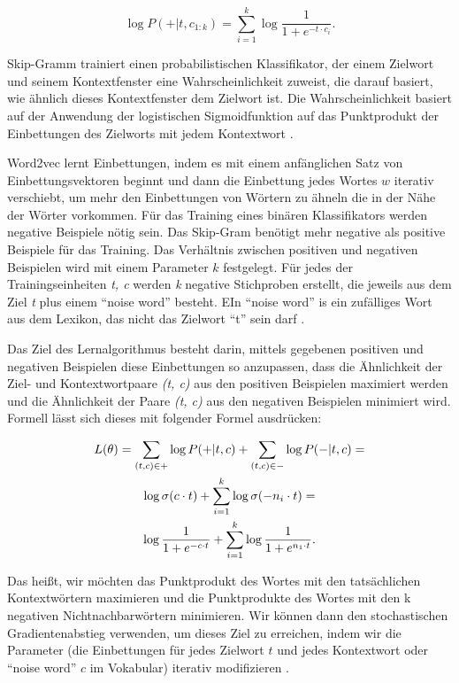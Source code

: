 \begin{equation} \label{Formel3_4}
    \log P(+|t,c_{1:k}) =\sum ^{k}_{i=1} \log \frac{1}{1+e^{-t\cdot c_{i}}}.
\end{equation}


Skip-Gramm trainiert einen probabilistischen Klassifikator, der einem Zielwort und seinem Kontextfenster eine Wahrscheinlichkeit zuweist, die darauf basiert, wie ähnlich dieses Kontextfenster dem Zielwort ist. Die Wahrscheinlichkeit basiert auf der Anwendung der logistischen Sigmoidfunktion auf das Punktprodukt der Einbettungen des Zielworts mit jedem Kontextwort \cite*[113]{Jurafskya}.

Word2vec lernt Einbettungen, indem es mit einem anfänglichen Satz von Einbettungsvektoren beginnt und dann die Einbettung jedes Wortes $w$ iterativ verschiebt, um mehr den Einbettungen von Wörtern zu ähneln die in der Nähe der Wörter vorkommen. Für das Training eines binären Klassifikators werden negative Beispiele nötig sein. Das Skip-Gram benötigt mehr negative als positive Beispiele für das Training. Das Verhältnis zwischen positiven und negativen Beispielen wird mit einem Parameter $k$ festgelegt. Für jedes der Trainingseinheiten \textit{t, c} werden \textit{k} negative Stichproben erstellt, die jeweils aus dem Ziel \textit{t} plus einem \enquote{noise word} besteht. EIn \enquote{noise word} is ein zufälliges Wort aus dem Lexikon, das nicht das Zielwort \enquote{t} sein darf \cite*[113]{Jurafskya}.

Das Ziel des Lernalgorithmus besteht darin, mittels gegebenen positiven und negativen Beispielen diese Einbettungen so anzupassen, dass die Ähnlichkeit der Ziel- und Kontextwortpaare \textit{(t, c)} aus den positiven Beispielen maximiert werden und die Ähnlichkeit der Paare \textit{(t, c)} aus den negativen Beispielen minimiert wird. Formell lässt sich dieses mit folgender Formel ausdrücken:

\begin{gather} \label{Formel3_5}
    L(\theta) = \sum_{(t,c)\in +}\log P(+|t,c)+\sum_{(t,c)\in -} \log P(-|t,c) =  \notag\\
    \log \sigma(c \cdot t)+\sum^{k}_{i=1}\log \sigma(-n_{i} \cdot t) = \notag\\
    \log \frac{1}{1+e^{-c \cdot t}}+\sum^{k}_{i=1}\log\frac{1}{1+e^{n_{1} \cdot t}}.
\end{gather}

Das heißt, wir möchten das Punktprodukt des Wortes mit den tatsächlichen Kontextwörtern maximieren und die Punktprodukte des Wortes mit den k negativen Nichtnachbarwörtern minimieren. Wir können dann den stochastischen Gradientenabstieg verwenden, um dieses Ziel zu erreichen, indem wir die Parameter (die Einbettungen für jedes Zielwort $t$ und jedes Kontextwort oder \enquote{noise word} $c$ im Vokabular) iterativ modifizieren \cite*[114]{Jurafskya}.

